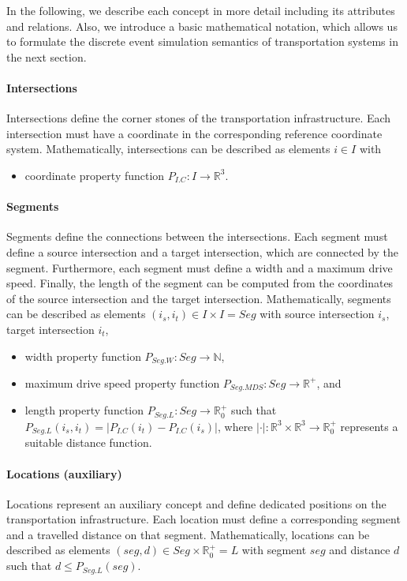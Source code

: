 \documentclass{article}
\begin{document}
    In the following, we describe each concept in more detail including its attributes and relations.
    Also, we introduce a basic mathematical notation, which allows us to formulate the discrete event simulation semantics of transportation systems in the next section.

    \paragraph{Intersections}
    Intersections define the corner stones of the transportation infrastructure.
    Each intersection must have a coordinate in the corresponding reference coordinate system.
    Mathematically, intersections can be described as elements $i \in I$ with 
    \begin{itemize}
        \item coordinate property function $P_{I.C}: I \rightarrow \mathbb{R}^3$.
    \end{itemize}

    \paragraph{Segments}
    Segments define the connections between the intersections.
    Each segment must define a source intersection and a target intersection, which are connected by the segment.
    Furthermore, each segment must define a width and a maximum drive speed.
    Finally, the length of the segment can be computed from the coordinates of the source intersection and the target intersection.
    Mathematically, segments can be described as elements $(i_s, i_t) \in I \times I = Seg$ with source intersection $i_s$, target intersection $i_t$,
    \begin{itemize}
        \item width property function $P_{Seg.W}: Seg \rightarrow \mathbb{N}$,
        \item maximum drive speed property function $P_{Seg.MDS}: Seg \rightarrow \mathbb{R}^+$, and
        \item length property function $P_{Seg.L}: Seg \rightarrow \mathbb{R}_0^+$ such that $P_{Seg.L}(i_s, i_t) = |P_{I.C}(i_t) - P_{I.C}(i_s)|$, where $|\cdot|: \mathbb{R}^3 \times \mathbb{R}^3 \rightarrow \mathbb{R}_0^+$ represents a suitable distance function.
    \end{itemize}

    \paragraph{Locations (auxiliary)}
    Locations represent an auxiliary concept and define dedicated positions on the transportation infrastructure.
    Each location must define a corresponding segment and a travelled distance on that segment.
    Mathematically, locations can be described as elements $(seg, d) \in Seg \times \mathbb{R}_0^+ = L$ with segment $seg$ and distance $d$ such that $d \leq P_{Seg.L}(seg)$.
\end{document}
